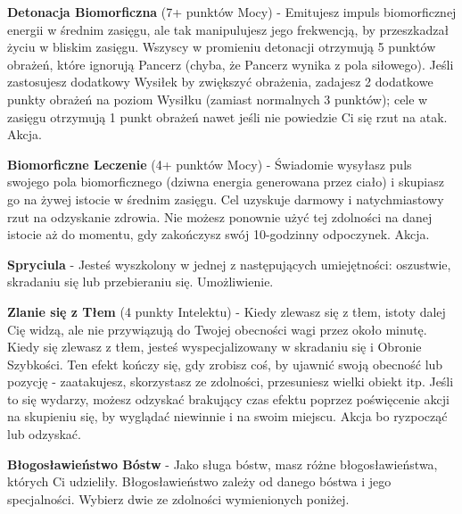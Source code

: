 \textbf{Detonacja Biomorficzna}\label{sec:Detonacja Biomorficzna} (7+ punktów Mocy) - Emitujesz impuls biomorficznej energii w średnim zasięgu, ale tak manipulujesz jego frekwencją, by przeszkadzał życiu w bliskim zasięgu. Wszyscy w promieniu detonacji otrzymują 5 punktów obrażeń, które ignorują Pancerz (chyba, że Pancerz wynika z pola siłowego). Jeśli zastosujesz dodatkowy Wysiłek by zwiększyć obrażenia, zadajesz 2 dodatkowe punkty obrażeń na poziom Wysiłku (zamiast normalnych 3 punktów); cele w zasięgu otrzymują 1 punkt obrażeń nawet jeśli nie powiedzie Ci się rzut na atak. Akcja. 

\textbf{Biomorficzne Leczenie}\label{sec:Detonacja Biomorficzna} (4+ punktów Mocy) - Świadomie wysyłasz puls swojego pola biomorficznego (dziwna energia generowana przez ciało) i skupiasz go na żywej istocie w średnim zasięgu. Cel uzyskuje darmowy i natychmiastowy rzut na odzyskanie zdrowia. Nie możesz ponownie użyć tej zdolności na danej istocie aż do momentu, gdy zakończysz swój 10-godzinny odpoczynek. Akcja. 

\textbf{Spryciula}\label{sec:Spryciula} - Jesteś wyszkolony w jednej z następujących umiejętności: oszustwie, skradaniu się lub przebieraniu się. Umożliwienie. 

\textbf{Zlanie się z Tłem}\label{sec:Zlanie się z Tłem} (4 punkty Intelektu) - Kiedy zlewasz się z tłem, istoty dalej Cię widzą, ale nie przywiązują do Twojej obecności wagi przez około minutę. Kiedy się zlewasz z tłem, jesteś wyspecjalizowany w skradaniu się i Obronie Szybkości. Ten efekt kończy się, gdy zrobisz coś, by ujawnić swoją obecność lub pozycję - zaatakujesz, skorzystasz ze zdolności, przesuniesz wielki obiekt itp. Jeśli to się wydarzy, możesz odzyskać brakujący czas efektu poprzez poświęcenie akcji na skupieniu się, by wyglądać niewinnie i na swoim miejscu. Akcja bo ryzpocząć lub odzyskać.

\textbf{Błogosławieństwo Bóstw}\label{sec:Błogosławieństwo Bóstw} - Jako sługa bóstw, masz różne błogosławieństwa, których Ci udzieliły. Błogosławieństwo zależy od danego bóstwa i jego specjalności. Wybierz dwie ze zdolności wymienionych poniżej.

